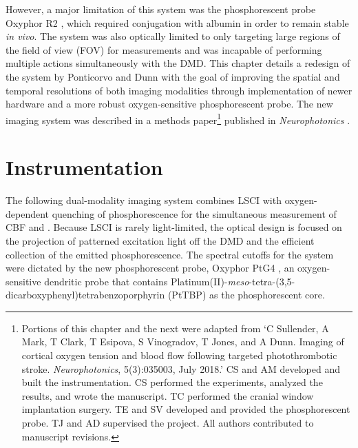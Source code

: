 However, a major limitation of this system was the phosphorescent probe Oxyphor R2 \cite{Dunphy:2002tz}, which required conjugation with albumin in order to remain stable \textit{in vivo}. The system was also optically limited to only targeting large regions of the field of view (FOV) for  measurements and was incapable of performing multiple actions simultaneously with the DMD. This chapter details a redesign of the system by Ponticorvo and Dunn \cite{Ponticorvo:2010uv} with the goal of improving the spatial and temporal resolutions of both imaging modalities through implementation of newer hardware and a more robust oxygen-sensitive phosphorescent probe. The new imaging system was described in a methods paper\footnote{Portions of this chapter and the next were adapted from `C Sullender, A Mark, T Clark, T Esipova, S Vinogradov, T Jones, and A Dunn. Imaging of cortical oxygen tension and blood flow following targeted photothrombotic stroke. \textit{Neurophotonics}, 5(3):035003, July 2018.' CS and AM developed and built the instrumentation. CS performed the experiments, analyzed the results, and wrote the manuscript. TC performed the cranial window implantation surgery. TE and SV developed and provided the phosphorescent probe. TJ and AD supervised the project. All authors contributed to manuscript revisions.} published in \textit{Neurophotonics} \cite{Sullender:2018ff}.



\section{Instrumentation}

The following dual-modality imaging system combines LSCI with oxygen-dependent quenching of phosphorescence for the simultaneous measurement of CBF and . Because LSCI is rarely light-limited, the optical design is focused on the projection of patterned excitation light off the DMD and the efficient collection of the emitted phosphorescence. The spectral cutoffs for the system were dictated by the new phosphorescent probe, Oxyphor PtG4 \cite{Esipova:2011hi}, an oxygen-sensitive dendritic probe that contains Platinum(II)-\textit{meso}-tetra-(3,5-dicarboxyphenyl)tetrabenzoporphyrin (PtTBP) as the phosphorescent core.

